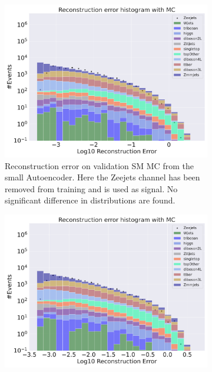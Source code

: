 \begin{figure}[h!]
    \centering
    \begin{subfigure}{.45\textwidth}
        \includegraphics[width=\textwidth]{Figures/AE_testing/small/b_data_recon_big_rm3_feats_sig_Zeejets.pdf}
        \caption{Reconstruction error on validation SM MC from the small Autoencoder. Here the Zeejets channel has been removed from training and 
        is used as signal. No significant difference in distributions are found.}
        \label{fig:ae_small_Zeejets}
    \end{subfigure}
    \hfill 
    \begin{subfigure}{.45\textwidth}
        \includegraphics[width=\textwidth]{Figures/AE_testing/big/b_data_recon_big_rm3_feats_sig_Zeejets.pdf}

\end{subfigure}
\end{figure}
